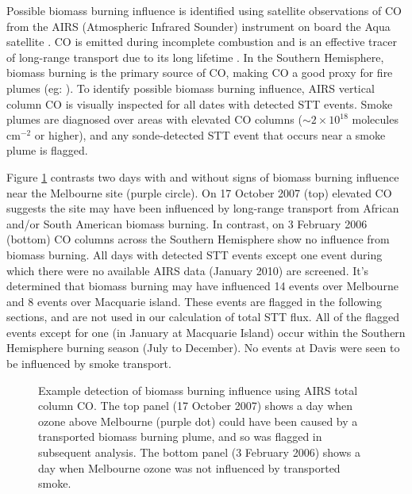     Possible biomass burning influence is identified using satellite observations of CO from the AIRS (Atmospheric Infrared Sounder) instrument on board the Aqua satellite \citep{AIRS3STD}.
    CO is emitted during incomplete combustion and is an effective tracer of long-range transport due to its long lifetime \citep{Edwards2003, Edwards2006}.
    In the Southern Hemisphere, biomass burning is the primary source of CO, making CO a good proxy for fire plumes (eg: \citet{Sinha2004, Mari2008}).
    To identify possible biomass burning influence, AIRS vertical column CO is visually inspected for all dates with detected STT events.
    Smoke plumes are diagnosed over areas with elevated CO columns ($\sim 2 \times 10^{18}$ molecules cm$^{-2}$ or higher), and any sonde-detected STT event that occurs near a smoke plume is flagged.

    Figure \ref{fig:excludedeg} contrasts two days with and without signs of biomass burning influence near the Melbourne site (purple circle).
    On 17 October 2007 (top) elevated CO suggests the site may have been influenced by long-range transport from African and/or South American biomass burning.
    In contrast, on 3 February 2006 (bottom) CO columns across the Southern Hemisphere show no influence from biomass burning.
    All days with detected STT events except one event during which there were no available AIRS data (January 2010) are screened.
    It's determined that biomass burning may have influenced 14 events over Melbourne and 8 events over Macquarie island.
    These events are flagged in the following sections, and are not used in our calculation of total STT flux.
    All of the flagged events except for one (in January at Macquarie Island) occur within the Southern Hemisphere burning season (July to December). %
    No events at Davis were seen to be influenced by smoke transport.
    
    \begin{figure}[t]
      \caption{ %
	Example detection of biomass burning influence using AIRS total column CO. 
	The top panel (17 October 2007) shows a day when ozone above Melbourne (purple dot) could have been caused by a transported biomass burning plume, and so was flagged in subsequent analysis.
	The bottom panel (3 February 2006) shows a day when Melbourne ozone was not influenced by transported smoke.
	}
      \label{fig:excludedeg}
    \end{figure}
    
